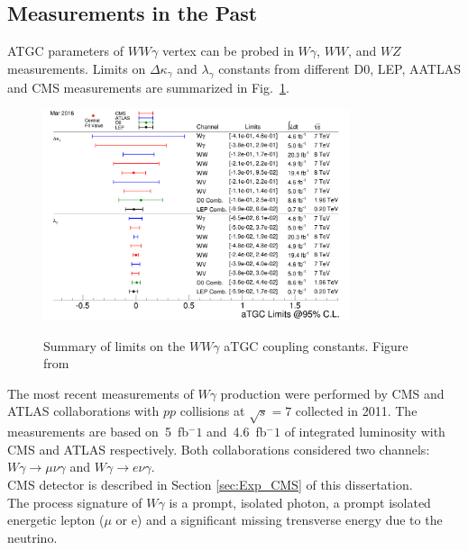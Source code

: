 \subsection{Measurements in the Past}

ATGC parameters of $WW\gamma$ vertex can be probed in $W\gamma$, $WW$, and $WZ$ measurements. Limits on $\Delta \kappa_\gamma$ and $\lambda_\gamma$ constants from different D0, LEP, AATLAS and CMS measurements are summarized in Fig.~\ref{fig:aTGC_cg}.\\ 

\begin{figure}[htb]
  \begin{center}
    {\includegraphics[width=0.80\textwidth]{../figs/WgAbout/aTGC_cg.png}}
    \caption{Summary of limits on the $WW\gamma$ aTGC coupling constants. Figure from \cite{ref_twiki_SMP_ATGC}}
    \label{fig:aTGC_cg}
  \end{center}
\end{figure}


The most recent measurements of $W\gamma$ production were performed by CMS \cite{ref_7TeV_CMS} and ATLAS \cite{ref_7TeV_ATLAS} collaborations with $pp$ collisions at $\sqrt{s}=7$ collected in 2011. The measurements are based on~5~fb$^-1$ and~4.6~fb$^-1$ of integrated luminosity with CMS and ATLAS respectively. Both collaborations considered two channels: $W\gamma\rightarrow\mu\nu\gamma$ and $W\gamma\rightarrow e\nu\gamma$.\\

CMS detector is described in Section \ref{sec:Exp_CMS} of this dissertation.\\

The process signature of $W\gamma$ is a prompt, isolated photon, a prompt isolated energetic lepton ($\mu$ or e) and a significant missing trensverse energy due to the neutrino. \\ 

